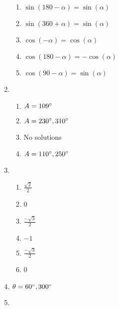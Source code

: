\documentclass{article}
\begin{document}
\begin{enumerate}
\begin{enumerate}
	\item $\sin{(180 - \alpha)} = \sin{(\alpha)}$
	
	\item $\sin{(360 + \alpha)} = \sin{(\alpha)}$
	
	\item $\cos{(-\alpha)} = \cos{(\alpha)}$
	
	\item $\cos{(180 - \alpha)} = -\cos{(\alpha)}$
	
	\item $\cos{(90 - \alpha)} = \sin{(\alpha)}$
	
	\end{enumerate}
	
\item

	\begin{enumerate}
	
	\item $A = 109\degree$
	
	\item $A = 230\degree, 310\degree$
	
	\item No solutions
	
	\item $A = 110\degree, 250\degree$
	
	\end{enumerate}
	
\item

	\begin{enumerate}
	
	\item $\frac{\sqrt{2}}{2}$
	
	\item 0
	
	\item $\frac{-\sqrt{3}}{2}$
	
	\item $-1$
	
	\item $\frac{-\sqrt{3}}{2}$
	
	\item 0
	
	\end{enumerate}
	
\item $\theta = 60\degree, 300\degree$

\item

	\begin{enumerate}
	

\end{enumerate}
\end{enumerate}
\end{document}
